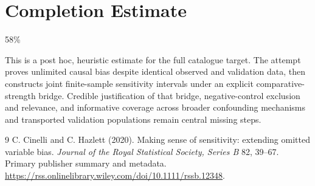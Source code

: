 \documentclass[11pt]{article}
\theoremstyle{remark}
\begin{document}
\section{Completion Estimate}
58\%

This is a post hoc, heuristic estimate for the full catalogue target.
The attempt proves unlimited causal bias despite identical observed and validation data, then constructs joint finite-sample sensitivity intervals under an explicit comparative-strength bridge. Credible justification of that bridge, negative-control exclusion and relevance, and informative coverage across broader confounding mechanisms and transported validation populations remain central missing steps.

\begin{thebibliography}{9}
 C. Cinelli and C. Hazlett (2020). Making sense of sensitivity: extending omitted variable bias. \emph{Journal of the Royal Statistical Society, Series B} 82, 39--67. Primary publisher summary and metadata. \url{https://rss.onlinelibrary.wiley.com/doi/10.1111/rssb.12348}.
\end{thebibliography}
\end{document}
